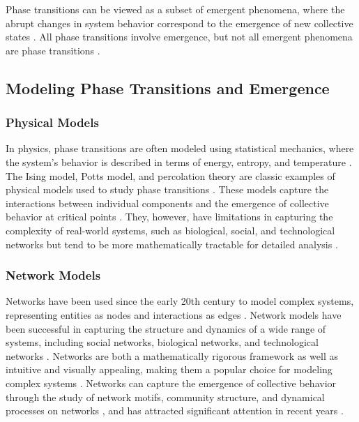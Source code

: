 Phase transitions can be viewed as a subset of emergent phenomena, where the abrupt changes in system behavior correspond to the emergence of new collective states \citep{sethna2006statistical, goldenfeld1992lectures}. All phase transitions involve emergence, but not all emergent phenomena are phase transitions \citep{bar2013computability}.

\subsection{Modeling Phase Transitions and Emergence}

\subsubsection{Physical Models}

In physics, phase transitions are often modeled using statistical mechanics, where the system's behavior is described in terms of energy, entropy, and temperature \citep{stanley1971phase, kadanoff2000statistical}. The Ising model, Potts model, and percolation theory are classic examples of physical models used to study phase transitions \citep{onsager1944crystal, stauffer2018introduction}. These models capture the interactions between individual components and the emergence of collective behavior at critical points \citep{binney1992theory}. They, however, have limitations in capturing the complexity of real-world systems, such as biological, social, and technological networks but tend to be more mathematically tractable for detailed analysis \citep{newman2011structure}.

\subsubsection{Network Models}

Networks have been used since the early 20th century to model complex systems, representing entities as nodes and interactions as edges \citep{watts1998collective, barabasi1999emergence}. Network models have been successful in capturing the structure and dynamics of a wide range of systems, including social networks, biological networks, and technological networks \citep{newman2003structure, albert2002statistical, strogatz2001exploring}. Networks are both a mathematically rigorous framework as well as intuitive and visually appealing, making them a popular choice for modeling complex systems \citep{newman2010networks}. Networks can capture the emergence of collective behavior through the study of network motifs, community structure, and dynamical processes on networks \citep{milo2002network, fortunato2010community, barrat2008dynamical}, and has attracted significant attention in recent years \citep{barabasi2016network}.

